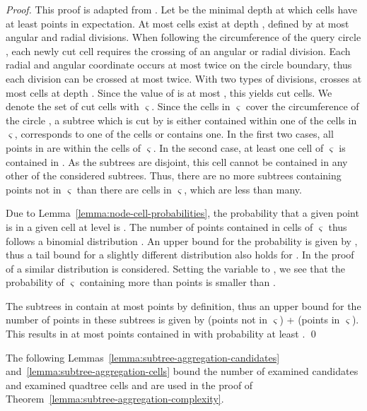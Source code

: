 \documentclass{llncs}
\newcommand{\ringset}{\ensuremath{\varsigma}\xspace}
\begin{document}
\begin{proof}
This proof is adapted from \cite[Lemma 3]{Looz2015HRG}.
Let  be the minimal depth at which cells have at least  points in expectation.
At most  cells exist at depth , defined by at most  angular and  radial divisions.
When following the circumference of the query circle , each newly cut cell requires the crossing of an angular or radial division.
Each radial and angular coordinate occurs at most twice on the circle boundary, thus each division can be crossed at most twice.
With two types of divisions,  crosses at most  cells at depth .
Since the value of  is at most , this yields  cut cells.
We denote the set of cut cells with \ringset.
Since the cells in \ringset cover the circumference of the circle , a subtree  which is cut by  is either contained within one of the cells in \ringset,
corresponds to one of the cells or contains one.
In the first two cases, all points in  are within the cells of \ringset.
In the second case, at least one cell of \ringset is contained in .
As the subtrees are disjoint, this cell cannot be contained in any other of the considered subtrees.
Thus, there are no more subtrees containing points not in \ringset than there are cells in \ringset, which are less than  many.

Due to Lemma~\ref{lemma:node-cell-probabilities}, the probability that a given point is in a given cell at level  is .
The number of points contained in cells of \ringset thus follows a binomial distribution .
An upper bound for the probability  is given by , thus a tail bound for a slightly different distribution 
also holds for .
In the proof of \cite[Lemma~7]{Looz2015HRG} a similar distribution is considered.
Setting the variable  to , we see that the probability of \ringset containing more than  points is smaller than .

The subtrees in \subtreeset contain at most  points by definition,
thus an upper bound for the number of points in these subtrees is given by  (points not in \ringset) +  (points in \ringset).
This results in at most  points contained in \subtreeset with probability at least .
\qed
\end{proof}

The following Lemmas~\ref{lemma:subtree-aggregation-candidates} and~\ref{lemma:subtree-aggregation-cells} bound the number of examined candidates and examined quadtree cells and are used in the proof of Theorem~\ref{lemma:subtree-aggregation-complexity}.
\end{document}
